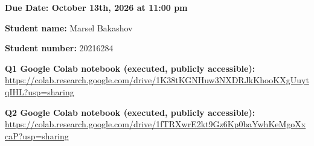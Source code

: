 \documentclass[12pt]{article}
\theoremstyle{definition}
\begin{document}
\fancyhead{}
\fancyfoot{}

\textbf{Due Date: October 13th, 2026 at 11:00 pm}

\textbf{Student name:} Marsel Bakashov\par
\textbf{Student number:} 20216284\par
\textbf{Q1 Google Colab notebook (executed, publicly accessible):} \url{https://colab.research.google.com/drive/1K38tKGNHuw3NXDRJkKhooKXgUuytqIHL?usp=sharing}\par
\textbf{Q2 Google Colab notebook (executed, publicly accessible):} \url{https://colab.research.google.com/drive/1fTRXwrE2kt9Gz6Kp0baYwhKeMgoXxcaP?usp=sharing}\par

\end{document}

